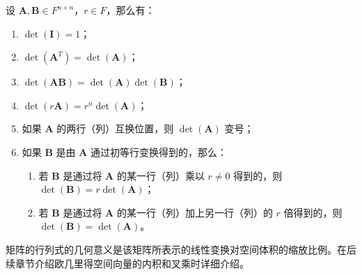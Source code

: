 \vspace{1em}

\begin{proposition}[行列式的性质]
    设 $\mathbf{A},\mathbf{B} \in F^{n \times n}$，$r\in F$，那么有：
    \begin{enumerate}
        \item $\det(\mathbf{I}) = 1$；
        \item $\det(\mathbf{A}^T) = \det(\mathbf{A})$；
        \item $\det(\mathbf{A}\mathbf{B}) = \det(\mathbf{A})\det(\mathbf{B})$；
        \item $\det(r\mathbf{A}) = r^n \det(\mathbf{A})$；
        \item 如果 $\mathbf{A}$ 的两行（列）互换位置，则 $\det(\mathbf{A})$ 变号；
        \item 如果 $\mathbf{B}$ 是由 $\mathbf{A}$ 通过初等行变换得到的，那么：
        \begin{enumerate}
            \item 若 $\mathbf{B}$ 是通过将 $\mathbf{A}$ 的某一行（列）乘以 $r\neq 0$ 得到的，则 $\det(\mathbf{B}) = r\det(\mathbf{A})$；
            \item 若 $\mathbf{B}$ 是通过将 $\mathbf{A}$ 的某一行（列）加上另一行（列）的 $r$ 倍得到的，则 $\det(\mathbf{B}) = \det(\mathbf{A})$。
        \end{enumerate}
    \end{enumerate}
\end{proposition}
\vspace{1em}

\begin{note}
    矩阵的行列式的几何意义是该矩阵所表示的线性变换对空间体积的缩放比例。在后续章节介绍欧几里得空间向量的内积和叉乘时详细介绍。
\end{note}


